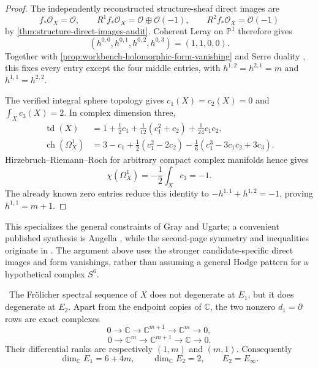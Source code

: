 \begin{proof}
The independently reconstructed structure-sheaf direct images are
\[
 f_*\mathcal O_X=\mathcal O,
 \qquad R^1f_*\mathcal O_X=\mathcal O\oplus\mathcal O(-1),
 \qquad R^2f_*\mathcal O_X=\mathcal O(-1)
\]
by \cref{thm:structure-direct-images-audit}.  Coherent Leray on
$\mathbb P^1$ therefore gives
\[
 (h^{0,0},h^{0,1},h^{0,2},h^{0,3})=(1,1,0,0).
\]
Together with \cref{prop:workbench-holomorphic-form-vanishing} and Serre
duality \cite[\S13, Theorem~4, p.~22]{Serre1955Duality}, this fixes every
entry except the four middle entries, with
$h^{1,2}=h^{2,1}=m$ and $h^{1,1}=h^{2,2}$.

The verified integral sphere topology gives $c_1(X)=c_2(X)=0$ and
$\int_Xc_3(X)=2$.  In complex dimension three,
\begin{align*}
 \operatorname{td}(X)
 &=1+\frac12c_1+\frac1{12}(c_1^2+c_2)+\frac1{24}c_1c_2,\\
 \operatorname{ch}(\Omega_X^1)
 &=3-c_1+\frac12(c_1^2-2c_2)
   -\frac16(c_1^3-3c_1c_2+3c_3).
\end{align*}
Hirzebruch--Riemann--Roch for arbitrary compact complex manifolds
\cite[Theorem~3, p.~427]{AtiyahSinger1963} hence gives
\[
 \chi(\Omega_X^1)=-\frac12\int_Xc_3=-1.
\]
The already known zero entries reduce this identity to
$-h^{1,1}+h^{1,2}=-1$, proving $h^{1,1}=m+1$.
\end{proof}

This specializes the general constraints of Gray and Ugarte; a convenient
published synthesis is Angella \cite{Angella2018}, while the second-page
symmetry and inequalities originate in \cite{Ugarte2000}.  The argument
above uses the stronger candidate-specific direct images and form
vanishings, rather than assuming a general Hodge pattern for a hypothetical
complex $S^6$.

\begin{theorem}
\label{thm:frolicher-e2-candidate}
\Verified\ The Fr\"olicher spectral sequence of $X$ does not degenerate at
$E_1$, but it does degenerate at $E_2$.  Apart from the endpoint copies of
$\mathbb C$, the two nonzero $d_1=\partial$ rows are exact complexes
\[
 0\longrightarrow\mathbb C
 \longrightarrow\mathbb C^{m+1}
 \longrightarrow\mathbb C^m
 \longrightarrow0,
\]
\[
 0\longrightarrow\mathbb C^m
 \longrightarrow\mathbb C^{m+1}
 \longrightarrow\mathbb C
 \longrightarrow0.
\]
Their differential ranks are respectively $(1,m)$ and $(m,1)$.
Consequently
\[
 \dim_{\mathbb C}E_1=6+4m,
 \qquad \dim_{\mathbb C}E_2=2,
 \qquad E_2=E_\infty.
\]
\end{theorem}

